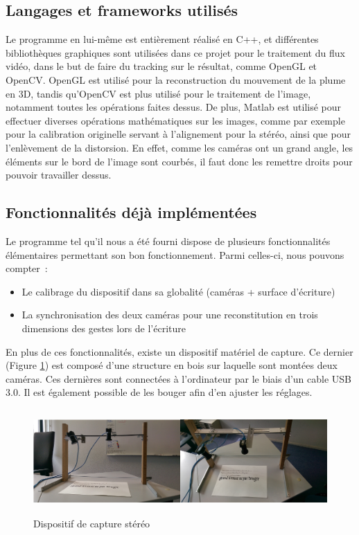 \subsection{Langages et frameworks utilisés}

Le programme en lui-même est entièrement réalisé en C++, et différentes bibliothèques graphiques sont utilisées dans ce projet pour le traitement du flux vidéo, dans le but de faire du tracking sur le résultat, comme OpenGL et OpenCV. OpenGL est utilisé pour la reconstruction du mouvement de la plume en 3D, tandis qu'OpenCV est plus utilisé pour le traitement de l'image, notamment toutes les opérations faites dessus. De plus, Matlab est utilisé pour effectuer diverses opérations mathématiques sur les images, comme par exemple pour la calibration originelle servant à l'alignement pour la stéréo, ainsi que pour l'enlèvement de la distorsion. En effet, comme les caméras ont un grand angle, les éléments sur le bord de l'image sont courbés, il faut donc les remettre droits pour pouvoir travailler dessus.

\subsection{Fonctionnalités déjà implémentées}

Le programme tel qu'il nous a été fourni dispose de plusieurs fonctionnalités élémentaires permettant son bon fonctionnement. Parmi celles-ci, nous pouvons compter~:
\begin{itemize}
\item Le calibrage du dispositif dans sa globalité (caméras + surface d'écriture)
\item La synchronisation des deux caméras pour une reconstitution en trois dimensions des gestes lors de l'écriture
\end{itemize}
En plus de ces fonctionnalités, existe un dispositif matériel de capture. Ce dernier (Figure \ref{cameras}) est composé d'une structure en bois sur laquelle sont montées deux caméras. Ces dernières sont connectées à l'ordinateur par le biais d'un cable USB 3.0. Il est également possible de les bouger afin d'en ajuster les réglages.

\begin{figure}[!h]
\centering
\includegraphics[width=\textwidth, height=4cm]{Modules/Picture/camerasPic.png}
\caption{Dispositif de capture stéréo}
\label{cameras}
\end{figure}

